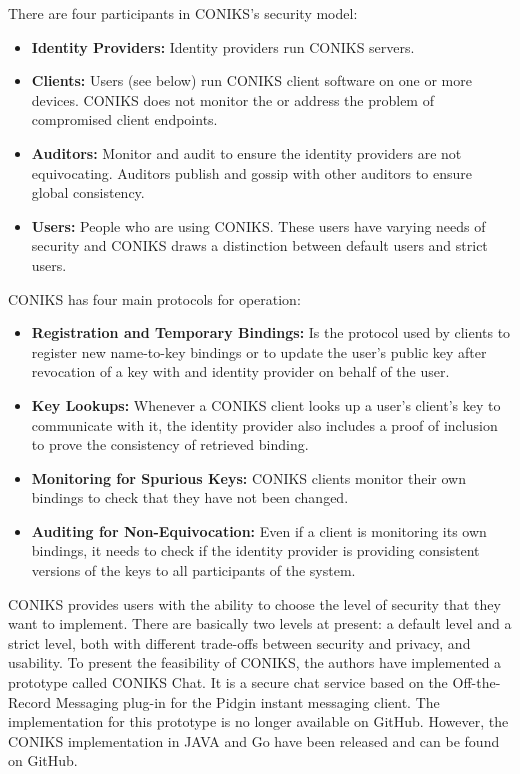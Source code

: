 There are four participants in CONIKS's security model:
\begin{itemize}
	\item \textbf{Identity Providers:} Identity providers run CONIKS servers.
	\item \textbf{Clients:} Users (see below) run CONIKS client software on one or more devices. CONIKS does not monitor the or address the 					problem of compromised client endpoints.
	\item \textbf{Auditors:} Monitor and audit to ensure the identity providers are not equivocating. Auditors publish and gossip with other auditors 		to ensure global consistency.
	\item \textbf{Users:} People who are using CONIKS. These users have varying needs of security and CONIKS draws a distinction between default 		users and strict users.	
\end{itemize}

CONIKS has four main protocols for operation:
\begin{itemize}

	\item \textbf{Registration and Temporary Bindings:} Is the protocol used by clients to register new name-to-key bindings or to update the user's 		public key after revocation of a key with and identity provider on behalf of the user.
	\item \textbf{Key Lookups:} Whenever a CONIKS client looks up a user's client's key to communicate with it, the identity provider also includes a 		proof of inclusion to prove the consistency of retrieved binding.
	\item \textbf{Monitoring for Spurious Keys:} CONIKS clients monitor their own bindings to check that they have not been changed.
	\item \textbf{Auditing for Non-Equivocation:} Even if a client is monitoring its own bindings, it needs to check if the identity provider is providing 		consistent versions of the keys to all participants of the system.
\end{itemize}

CONIKS provides users with the ability to choose the level of security that they want to implement. There are basically two levels at present: a default level and a strict level, both with different trade-offs between security and privacy, and usability. To present the feasibility of CONIKS, the authors have implemented a prototype called CONIKS Chat. It is a secure chat service based on the Off-the-Record Messaging plug-in for the Pidgin instant messaging client. The implementation for this prototype is no longer available on GitHub. However, the CONIKS implementation in JAVA and Go have been released and can be found on GitHub.

